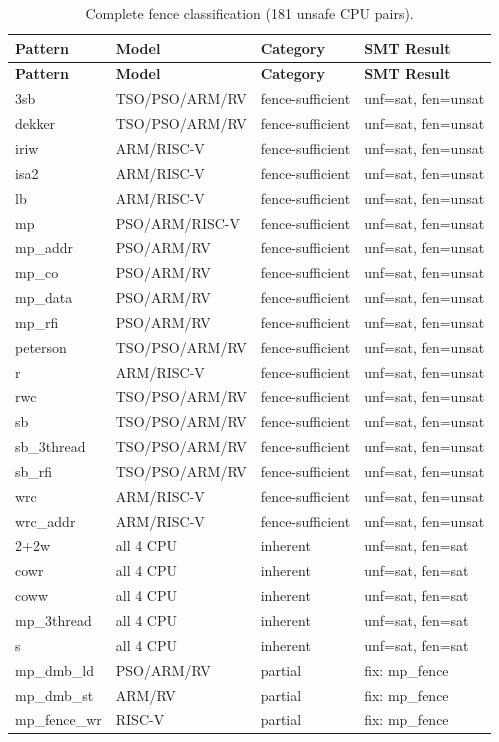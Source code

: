\documentclass[11pt]{article}
\begin{document}
\begin{longtable}{llll}
\caption{Complete fence classification (181 unsafe CPU pairs).}
\label{tab:all-fence-proofs} \\
\toprule
\textbf{Pattern} & \textbf{Model} & \textbf{Category} & \textbf{SMT Result} \\
\midrule
\endfirsthead
\toprule
\textbf{Pattern} & \textbf{Model} & \textbf{Category} & \textbf{SMT Result} \\
\midrule
\endhead
\bottomrule
\endfoot
3sb & TSO/PSO/ARM/RV & fence-sufficient & unf=sat, fen=unsat \\
dekker & TSO/PSO/ARM/RV & fence-sufficient & unf=sat, fen=unsat \\
iriw & ARM/RISC-V & fence-sufficient & unf=sat, fen=unsat \\
isa2 & ARM/RISC-V & fence-sufficient & unf=sat, fen=unsat \\
lb & ARM/RISC-V & fence-sufficient & unf=sat, fen=unsat \\
mp & PSO/ARM/RISC-V & fence-sufficient & unf=sat, fen=unsat \\
mp\_addr & PSO/ARM/RV & fence-sufficient & unf=sat, fen=unsat \\
mp\_co & PSO/ARM/RV & fence-sufficient & unf=sat, fen=unsat \\
mp\_data & PSO/ARM/RV & fence-sufficient & unf=sat, fen=unsat \\
mp\_rfi & PSO/ARM/RV & fence-sufficient & unf=sat, fen=unsat \\
peterson & TSO/PSO/ARM/RV & fence-sufficient & unf=sat, fen=unsat \\
r & ARM/RISC-V & fence-sufficient & unf=sat, fen=unsat \\
rwc & TSO/PSO/ARM/RV & fence-sufficient & unf=sat, fen=unsat \\
sb & TSO/PSO/ARM/RV & fence-sufficient & unf=sat, fen=unsat \\
sb\_3thread & TSO/PSO/ARM/RV & fence-sufficient & unf=sat, fen=unsat \\
sb\_rfi & TSO/PSO/ARM/RV & fence-sufficient & unf=sat, fen=unsat \\
wrc & ARM/RISC-V & fence-sufficient & unf=sat, fen=unsat \\
wrc\_addr & ARM/RISC-V & fence-sufficient & unf=sat, fen=unsat \\
\midrule
2+2w & all 4 CPU & inherent & unf=sat, fen=sat \\
cowr & all 4 CPU & inherent & unf=sat, fen=sat \\
coww & all 4 CPU & inherent & unf=sat, fen=sat \\
mp\_3thread & all 4 CPU & inherent & unf=sat, fen=sat \\
s & all 4 CPU & inherent & unf=sat, fen=sat \\
\midrule
mp\_dmb\_ld & PSO/ARM/RV & partial & fix: mp\_fence \\
mp\_dmb\_st & ARM/RV & partial & fix: mp\_fence \\
mp\_fence\_wr & RISC-V & partial & fix: mp\_fence \\
\end{longtable}
\end{document}
